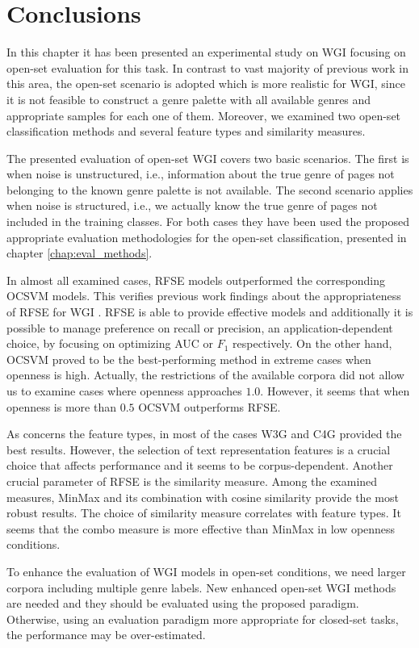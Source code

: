\section{Conclusions}\label{chap:noise:sec:conclusions}

In this chapter it has been presented an experimental study on WGI focusing on open-set evaluation for this task. In contrast to vast majority of previous work in this area, the open-set scenario is adopted which is more realistic for WGI, since it is not feasible to construct a genre palette with all available genres and appropriate samples for each one of them. Moreover, we examined two open-set classification methods and several feature types and similarity measures.

The presented evaluation of open-set WGI covers two basic scenarios. The first is when noise is unstructured, i.e., information about the true genre of pages not belonging to the known genre palette is not available. The second scenario applies when noise is structured, i.e., we actually know the true genre of pages not included in the training classes. For both cases they have been used the proposed appropriate evaluation methodologies for the open-set classification, presented in chapter \ref{chap:eval_methods}.

In almost all examined cases, RFSE models outperformed the corresponding OCSVM models. This verifies previous work findings about the appropriateness of RFSE for WGI \parencite{pritsos2013open}. RFSE is able to provide effective models and additionally it is possible to manage preference on recall or precision, an application-dependent choice, by focusing on optimizing AUC or $F_1$ respectively. On the other hand, OCSVM proved to be the best-performing method in extreme cases when openness is high. Actually, the restrictions of the available corpora did not allow us to examine cases where openness approaches $1.0$. However, it seems that when openness is more than $0.5$ OCSVM outperforms RFSE.

As concerns the feature types, in most of the cases W3G and C4G provided the best results. However, the selection of text representation features is a crucial choice that affects performance and it seems to be corpus-dependent. Another crucial parameter of RFSE is the similarity measure. Among the examined measures, MinMax and its combination with cosine similarity provide the most robust results. The choice of similarity measure correlates with feature types. It seems that the combo measure is more effective than MinMax in low openness conditions.

To enhance the evaluation of WGI models in open-set conditions, we need larger corpora including multiple genre labels. New enhanced open-set WGI methods are needed and they should be evaluated using the proposed paradigm. Otherwise, using an evaluation paradigm more appropriate for closed-set tasks, the performance may be over-estimated.